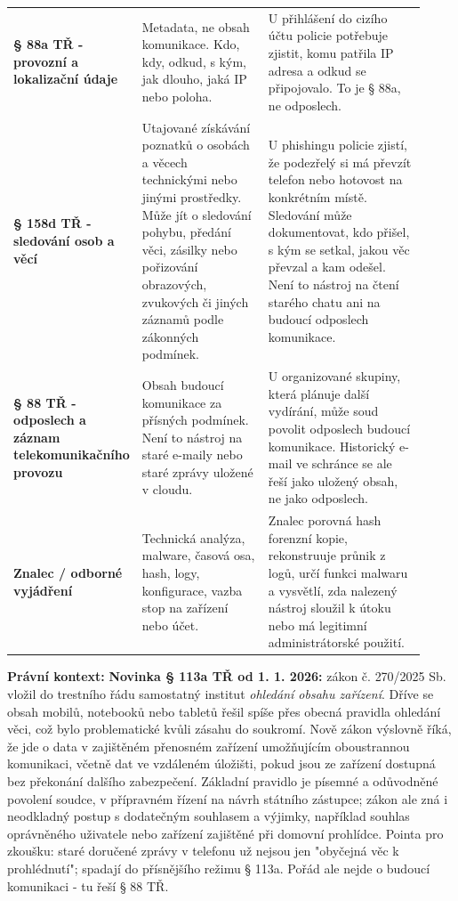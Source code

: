 \documentclass[11pt,a4paper]{article}
\newcommand{\pravobox}[1]{\begin{tcolorbox}[breakable,enhanced,colback=yellow!18,colframe=yellow!45!black,boxrule=0pt,arc=1mm,left=5pt,right=5pt,top=5pt,bottom=5pt,before skip=6pt,after skip=6pt]\textbf{Právní kontext:} #1\end{tcolorbox}}
\begin{document}
\begin{longtable}{p{0.16\linewidth}p{0.34\linewidth}p{0.42\linewidth}}
\addlinespace
\textbf{§ 88a TŘ - provozní a lokalizační údaje} & Metadata, ne obsah komunikace. Kdo, kdy, odkud, s kým, jak dlouho, jaká IP nebo poloha. & U přihlášení do cizího účtu policie potřebuje zjistit, komu patřila IP adresa a odkud se připojovalo. To je § 88a, ne odposlech.\\
\addlinespace
\textbf{§ 158d TŘ - sledování osob a věcí} & Utajované získávání poznatků o osobách a věcech technickými nebo jinými prostředky. Může jít o sledování pohybu, předání věci, zásilky nebo pořizování obrazových, zvukových či jiných záznamů podle zákonných podmínek. & U phishingu policie zjistí, že podezřelý si má převzít telefon nebo hotovost na konkrétním místě. Sledování může dokumentovat, kdo přišel, s kým se setkal, jakou věc převzal a kam odešel. Není to nástroj na čtení starého chatu ani na budoucí odposlech komunikace.\\
\addlinespace
\textbf{§ 88 TŘ - odposlech a záznam telekomunikačního provozu} & Obsah budoucí komunikace za přísných podmínek. Není to nástroj na staré e-maily nebo staré zprávy uložené v cloudu. & U organizované skupiny, která plánuje další vydírání, může soud povolit odposlech budoucí komunikace. Historický e-mail ve schránce se ale řeší jako uložený obsah, ne jako odposlech.\\
\addlinespace
\textbf{Znalec / odborné vyjádření} & Technická analýza, malware, časová osa, hash, logy, konfigurace, vazba stop na zařízení nebo účet. & Znalec porovná hash forenzní kopie, rekonstruuje průnik z logů, určí funkci malwaru a vysvětlí, zda nalezený nástroj sloužil k útoku nebo má legitimní administrátorské použití.\\
\bottomrule
\end{longtable}

\pravobox{\textbf{Novinka § 113a TŘ od 1. 1. 2026:} zákon č. 270/2025 Sb. vložil do trestního řádu samostatný institut \emph{ohledání obsahu zařízení}. Dříve se obsah mobilů, notebooků nebo tabletů řešil spíše přes obecná pravidla ohledání věci, což bylo problematické kvůli zásahu do soukromí. Nově zákon výslovně říká, že jde o data v zajištěném přenosném zařízení umožňujícím oboustrannou komunikaci, včetně dat ve vzdáleném úložišti, pokud jsou ze zařízení dostupná bez překonání dalšího zabezpečení. Základní pravidlo je písemné a odůvodněné povolení soudce, v přípravném řízení na návrh státního zástupce; zákon ale zná i neodkladný postup s dodatečným souhlasem a výjimky, například souhlas oprávněného uživatele nebo zařízení zajištěné při domovní prohlídce. Pointa pro zkoušku: staré doručené zprávy v telefonu už nejsou jen "obyčejná věc k prohlédnutí"; spadají do přísnějšího režimu § 113a. Pořád ale nejde o budoucí komunikaci - tu řeší § 88 TŘ.}
\end{document}
